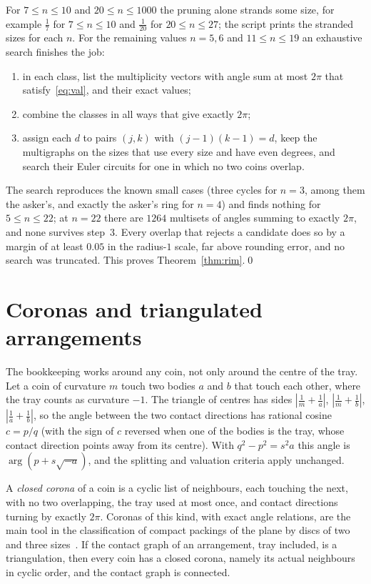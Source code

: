 \documentclass[11pt]{amsart}
\theoremstyle{remark}
\begin{document}
For $7\le n\le10$ and $20\le n\le1000$ the pruning alone strands some size, for example $\frac17$ for $7\le n\le10$ and $\frac1{20}$ for $20\le n\le27$; the script prints the stranded sizes for each $n$. For the remaining values $n=5,6$ and $11\le n\le19$ an exhaustive search finishes the job:
\begin{enumerate}
\item in each class, list the multiplicity vectors with angle sum at most $2\pi$ that satisfy~\eqref{eq:val}, and their exact values;
\item combine the classes in all ways that give exactly $2\pi$;
\item assign each $d$ to pairs $(j,k)$ with $(j-1)(k-1)=d$, keep the multigraphs on the sizes that use every size and have even degrees, and search their Euler circuits for one in which no two coins overlap.
\end{enumerate}
The search reproduces the known small cases (three cycles for $n=3$, among them the asker's, and exactly the asker's ring for $n=4$) and finds nothing for $5\le n\le22$; at $n=22$ there are $1264$ multisets of angles summing to exactly $2\pi$, and none survives step~3. Every overlap that rejects a candidate does so by a margin of at least $0.05$ in the radius-$1$ scale, far above rounding error, and no search was truncated. This proves Theorem~\ref{thm:rim}.\qed

\section{Coronas and triangulated arrangements}

The bookkeeping works around any coin, not only around the centre of the tray. Let a coin of curvature $m$ touch two bodies $a$ and $b$ that touch each other, where the tray counts as curvature $-1$. The triangle of centres has sides $|\frac1m+\frac1a|$, $|\frac1m+\frac1b|$, $|\frac1a+\frac1b|$, so the angle between the two contact directions has rational cosine $c=p/q$ (with the sign of $c$ reversed when one of the bodies is the tray, whose contact direction points away from its centre). With $q^2-p^2=s^2a$ this angle is $\arg(p+s\sqrt{-a})$, and the splitting and valuation criteria apply unchanged.

A \emph{closed corona} of a coin is a cyclic list of neighbours, each touching the next, with no two overlapping, the tray used at most once, and contact directions turning by exactly $2\pi$. Coronas of this kind, with exact angle relations, are the main tool in the classification of compact packings of the plane by discs of two and three sizes~\cite{Kennedy,FHS}. If the contact graph of an arrangement, tray included, is a triangulation, then every coin has a closed corona, namely its actual neighbours in cyclic order, and the contact graph is connected.
\end{document}

